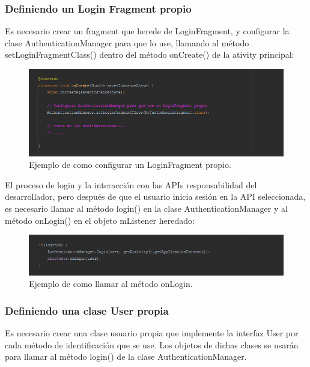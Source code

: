\subsubsection{Definiendo un Login Fragment propio}

Es necesario crear un fragment que herede de LoginFragment, y configurar la clase AuthenticationManager para que lo use, llamando al método setLoginFragmentClass() dentro del método onCreate() de la ativity principal:

\begin{figure}[H]
  \centering
    \includegraphics[scale=0.6]{50-anexos/B-uso/identificacion_propio_configurar.png} 
    \caption{Ejemplo de como configurar un LoginFragment propio.}
\end{figure}	


El proceso de login y la interacción con las APIs responsabilidad del desarrollador, pero después de que el usuario inicia sesión en la API seleccionada, es necesario llamar al método login() en la clase AuthenticationManager y al método onLogin() en el objeto mListener heredado:

\begin{figure}[H]
  \centering
    \includegraphics[scale=0.6]{50-anexos/B-uso/identificacion_loginOk.png} 
    \caption{Ejemplo de como llamar al método onLogin.}
\end{figure}	



\subsubsection{Definiendo una clase User propia}

Es necesario crear una clase usuario propia que implemente la interfaz User por cada método de identificación que se use. Los objetos de dichas clases se usarán para llamar al método login() de la clase AuthenticationManager.

